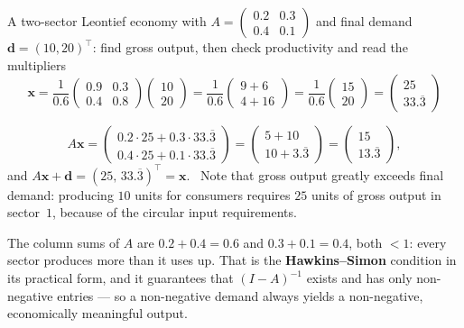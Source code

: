 \begin{worked}{A two-sector Leontief economy with $A=\begin{pmatrix}0.2&0.3\\0.4&0.1\end{pmatrix}$ and final demand $\mathbf d=(10,20)^{\!\top}$: find gross output, then check productivity and read the multipliers}
\[
  \mathbf x=\frac{1}{0.6}\begin{pmatrix}0.9&0.3\\0.4&0.8\end{pmatrix}
             \begin{pmatrix}10\\20\end{pmatrix}
  =\frac{1}{0.6}\begin{pmatrix}9+6\\4+16\end{pmatrix}
  =\frac{1}{0.6}\begin{pmatrix}15\\20\end{pmatrix}
  =\boxed{\begin{pmatrix}25\\ 33.\overline{3}\end{pmatrix}}
\]

\[
  A\mathbf x=\begin{pmatrix}0.2\cdot25+0.3\cdot33.\overline{3}\\
                            0.4\cdot25+0.1\cdot33.\overline{3}\end{pmatrix}
  =\begin{pmatrix}5+10\\10+3.\overline{3}\end{pmatrix}
  =\begin{pmatrix}15\\13.\overline{3}\end{pmatrix},
\]
and $A\mathbf x+\mathbf d=(25,\,33.\overline{3})^{\!\top}=\mathbf x$.
\checkmark\ Note that gross output greatly exceeds final demand: producing
$10$ units for consumers requires $25$ units of gross output in sector~$1$,
because of the circular input requirements.

The column sums of $A$ are $0.2+0.4=0.6$ and $0.3+0.1=0.4$, both $<1$: every
sector produces more than it uses up. That is the \textbf{Hawkins--Simon}
condition in its practical form, and it guarantees that $(I-A)^{-1}$ exists
and has only non-negative entries --- so a non-negative demand always yields
a non-negative, economically meaningful output.


\end{worked}
